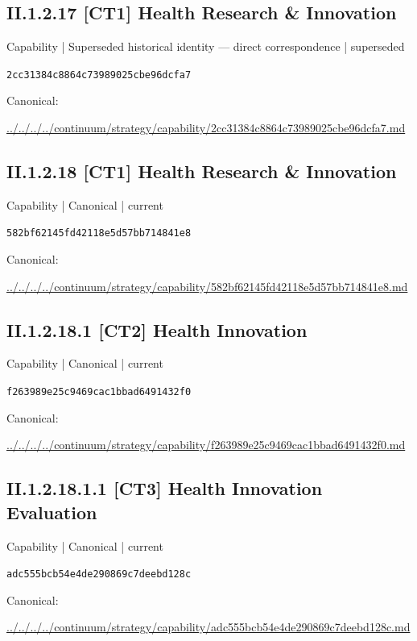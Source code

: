 \documentclass[10pt,a4paper]{article}
\begin{document}
\subsection*{II.1.2.17 [CT1] Health Research \& Innovation}
{\small Capability | Superseded historical identity — direct correspondence | superseded}\par
\texttt{2cc31384c8864c73989025cbe96dcfa7}\par
Canonical: \par
{\footnotesize\url{../../../../continuum/strategy/capability/2cc31384c8864c73989025cbe96dcfa7.md}}\par
\subsection*{II.1.2.18 [CT1] Health Research \& Innovation}
{\small Capability | Canonical | current}\par
\texttt{582bf62145fd42118e5d57bb714841e8}\par
Canonical: \par
{\footnotesize\url{../../../../continuum/strategy/capability/582bf62145fd42118e5d57bb714841e8.md}}\par
\subsection*{II.1.2.18.1 [CT2] Health Innovation}
{\small Capability | Canonical | current}\par
\texttt{f263989e25c9469cac1bbad6491432f0}\par
Canonical: \par
{\footnotesize\url{../../../../continuum/strategy/capability/f263989e25c9469cac1bbad6491432f0.md}}\par
\subsection*{II.1.2.18.1.1 [CT3] Health Innovation Evaluation}
{\small Capability | Canonical | current}\par
\texttt{adc555bcb54e4de290869c7deebd128c}\par
Canonical: \par
{\footnotesize\url{../../../../continuum/strategy/capability/adc555bcb54e4de290869c7deebd128c.md}}\par
\end{document}
